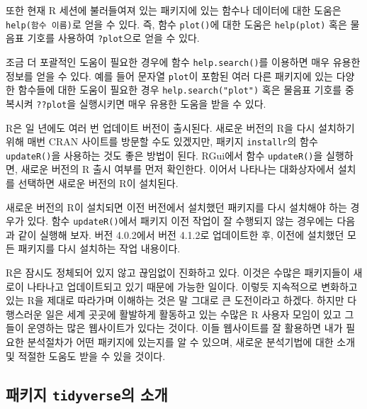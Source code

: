 \documentclass[
]{book}
\newenvironment{Shaded}{\begin{snugshade}}{\end{snugshade}}
\newcommand{\AttributeTok}[1]{\textcolor[rgb]{0.77,0.63,0.00}{#1}}
\newcommand{\FunctionTok}[1]{\textcolor[rgb]{0.00,0.00,0.00}{#1}}
\newcommand{\NormalTok}[1]{#1}
\newcommand{\OtherTok}[1]{\textcolor[rgb]{0.56,0.35,0.01}{#1}}
\newcommand{\SpecialCharTok}[1]{\textcolor[rgb]{0.00,0.00,0.00}{#1}}
\newcommand{\StringTok}[1]{\textcolor[rgb]{0.31,0.60,0.02}{#1}}
\begin{document}
또한 현재 R 세션에 불러들여져 있는 패키지에 있는 함수나 데이터에 대한
도움은 \texttt{help(함수\ 이름)}로 얻을 수 있다. 즉, 함수 \texttt{plot()}에 대한 도움은
\texttt{help(plot)} 혹은 물음표 기호를 사용하여 \texttt{?plot}으로 얻을 수 있다.

조금 더 포괄적인 도움이 필요한 경우에 함수 \texttt{help.search()}를 이용하면
매우 유용한 정보를 얻을 수 있다. 예를 들어 문자열 \texttt{plot}이 포함된 여러
다른 패키지에 있는 다양한 함수들에 대한 도움이 필요한 경우
\texttt{help.search("plot")} 혹은 물음표 기호를 중복시켜 \texttt{??plot}을 실행시키면
매우 유용한 도움을 받을 수 있다.

R은 일 년에도 여러 번 업데이트 버전이 출시된다. 새로운 버전의 R을 다시
설치하기 위해 매번 CRAN 사이트를 방문할 수도 있겠지만, 패키지
\texttt{installr}의 함수 \texttt{updateR()}을 사용하는 것도 좋은 방법이 된다. RGui에서
함수 \texttt{updateR()}을 실행하면, 새로운 버전의 R 출시 여부를 먼저 확인한다.
이어서 나타나는 대화상자에서 설치를 선택하면 새로운 버전의 R이
설치된다.

새로운 버전의 R이 설치되면 이전 버전에서 설치했던 패키지를 다시 설치해야
하는 경우가 있다. 함수 \texttt{updateR()}에서 패키지 이전 작업이 잘 수행되지
않는 경우에는 다음과 같이 실행해 보자. 버전 4.0.2에서 버전 4.1.2로
업데이트한 후, 이전에 설치했던 모든 패키지를 다시 설치하는 작업
내용이다.

\begin{Shaded}
\end{Shaded}

R은 잠시도 정체되어 있지 않고 끊임없이 진화하고 있다. 이것은 수많은
패키지들이 새로이 나타나고 업데이트되고 있기 때문에 가능한 일이다.
이렇듯 지속적으로 변화하고 있는 R을 제대로 따라가며 이해하는 것은 말
그대로 큰 도전이라고 하겠다. 하지만 다행스러운 일은 세계 곳곳에
활발하게 활동하고 있는 수많은 R 사용자 모임이 있고 그들이 운영하는 많은
웹사이트가 있다는 것이다. 이들 웹사이트를 잘 활용하면 내가 필요한
분석절차가 어떤 패키지에 있는지를 알 수 있으며, 새로운 분석기법에 대한
소개 및 적절한 도움도 받을 수 있을 것이다.

\hypertarget{uxd328uxd0a4uxc9c0-tidyverseuxc758-uxc18cuxac1c}{%
\subsection{\texorpdfstring{패키지 \texttt{tidyverse}의 소개}{패키지 tidyverse의 소개}}\label{uxd328uxd0a4uxc9c0-tidyverseuxc758-uxc18cuxac1c}}
\end{document}
